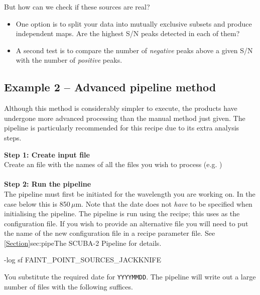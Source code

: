 But how can we check if these sources are real?
\begin{itemize}

\item One option is to split your data into mutually exclusive subsets
  and produce independent maps. Are the highest S/N peaks detected in each of
  them?
\item A second test is to compare the number of \emph{negative} peaks above
  a given S/N with the number of \emph{positive} peaks.
\end{itemize}

\subsection{Example 2 -- Advanced pipeline method}
\label{sec:jk}

Although this method is considerably simpler to execute, the products
have undergone more advanced processing than the manual method just
given. The pipeline is particularly recommended for this recipe due to
its extra analysis steps.

\textbf{Step 1: Create input file}\\
Create an file with the names of all the files you wish to process (e.g.
)
\\ \\
\textbf{Step 2: Run the pipeline}\\
The pipeline must first be initiated for the wavelength you are
working on. In the case below this is 850\,$\mu$m. Note that the date
does not \emph{have} to be specified when initialising the pipeline.
The pipeline is run using the
recipe; this uses  as the
configuration file. If you wish to provide an alternative file you
will need to put the name of the new configuration file in a recipe
parameter file.  See \cref{Section}{sec:pipe}{The SCUBA-2 Pipeline}
for details.
\begin{terminalv}
-log sf FAINT_POINT_SOURCES_JACKKNIFE
\end{terminalv}

You substitute the required date for \texttt{YYYYMMDD}.
The pipeline will write out a large number of files with the following
suffices.

